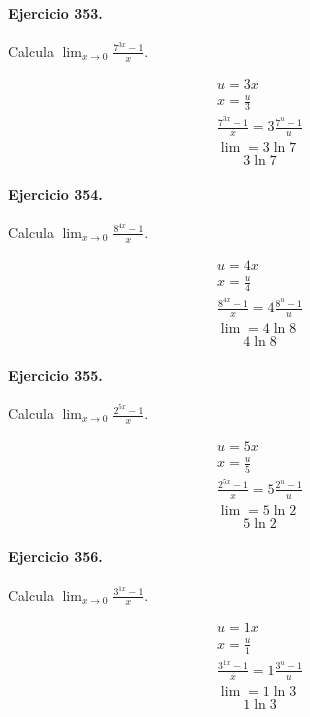 \documentclass[11pt,a4paper]{article}
\begin{document}
\paragraph{Ejercicio 353.} Calcula $\displaystyle\lim_{x\to0}\frac{7^{3x}-1}{x}$.

\[
\begin{aligned}
u=3x\\
x=\frac{u}{3}\\
\frac{7^{3x}-1}{x}=3\frac{7^u-1}{u}\\
\lim=3\ln 7
\end{aligned}
\]
\[\boxed{3\ln 7}\]


\paragraph{Ejercicio 354.} Calcula $\displaystyle\lim_{x\to0}\frac{8^{4x}-1}{x}$.

\[
\begin{aligned}
u=4x\\
x=\frac{u}{4}\\
\frac{8^{4x}-1}{x}=4\frac{8^u-1}{u}\\
\lim=4\ln 8
\end{aligned}
\]
\[\boxed{4\ln 8}\]


\paragraph{Ejercicio 355.} Calcula $\displaystyle\lim_{x\to0}\frac{2^{5x}-1}{x}$.

\[
\begin{aligned}
u=5x\\
x=\frac{u}{5}\\
\frac{2^{5x}-1}{x}=5\frac{2^u-1}{u}\\
\lim=5\ln 2
\end{aligned}
\]
\[\boxed{5\ln 2}\]


\paragraph{Ejercicio 356.} Calcula $\displaystyle\lim_{x\to0}\frac{3^{1x}-1}{x}$.

\[
\begin{aligned}
u=1x\\
x=\frac{u}{1}\\
\frac{3^{1x}-1}{x}=1\frac{3^u-1}{u}\\
\lim=1\ln 3
\end{aligned}
\]
\[\boxed{1\ln 3}\]
\end{document}
